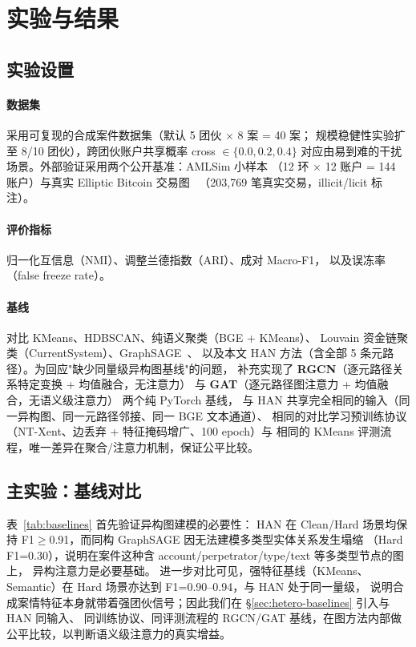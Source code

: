 \documentclass[12pt,a4paper]{ctexart}
\begin{document}
\section{实验与结果}

\subsection{实验设置}

\paragraph{数据集} 采用可复现的合成案件数据集（默认 5 团伙 $\times$ 8 案 = 40 案；
规模稳健性实验扩至 8/10 团伙），跨团伙账户共享概率 cross $\in \{0.0, 0.2, 0.4\}$
对应由易到难的干扰场景。外部验证采用两个公开基准：AMLSim 小样本
（12 环 $\times$ 12 账户 = 144 账户）与真实 Elliptic Bitcoin 交易图~\cite{weber2019elliptic}
（203{,}769 笔真实交易，illicit/licit 标注）。

\paragraph{评价指标} 归一化互信息（NMI）、调整兰德指数（ARI）、成对 Macro-F1，
以及误冻率（false freeze rate）。

\paragraph{基线} 对比 KMeans、HDBSCAN、纯语义聚类（BGE + KMeans）、
Louvain 资金链聚类（CurrentSystem）、GraphSAGE~\cite{hamilton2017graphsage}、
以及本文 HAN 方法（含全部 5 条元路径）。为回应"缺少同量级异构图基线"的问题，
补充实现了 \textbf{RGCN}（逐元路径关系特定变换 + 均值融合，无注意力）\cite{schlichtkrull2018rgcn} 与
\textbf{GAT}（逐元路径图注意力 + 均值融合，无语义级注意力）\cite{velickovic2018gat} 两个纯 PyTorch 基线，
与 HAN 共享完全相同的输入（同一异构图、同一元路径邻接、同一 BGE 文本通道）、
相同的对比学习预训练协议（NT-Xent、边丢弃 + 特征掩码增广、100 epoch）与
相同的 KMeans 评测流程，唯一差异在聚合/注意力机制，保证公平比较。

\subsection{主实验：基线对比}

表~\ref{tab:baselines} 首先验证异构图建模的必要性：
HAN 在 Clean/Hard 场景均保持 F1$\ge$0.91，而同构 GraphSAGE 因无法建模多类型实体关系发生塌缩
（Hard F1=0.30），说明在案件这种含 account/perpetrator/type/text 等多类型节点的图上，
异构注意力是必要基础。
进一步对比可见，强特征基线（KMeans、Semantic）在 Hard 场景亦达到 F1=0.90--0.94，与 HAN 处于同一量级，
说明合成案情特征本身就带着强团伙信号；因此我们在 \S\ref{sec:hetero-baselines} 引入与 HAN 同输入、
同训练协议、同评测流程的 RGCN/GAT 基线，在图方法内部做公平比较，以判断语义级注意力的真实增益。
\end{document}
